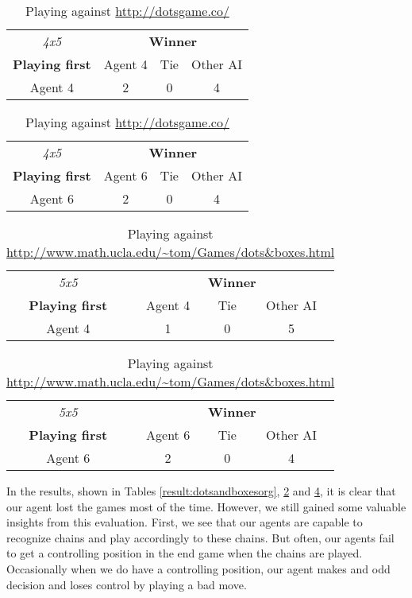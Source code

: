 \begin{table}[!h]
	\centering
	\begin{tabular}{c | c | c | c}
		\textit{4x5} & \multicolumn{3}{c}{\textbf{Winner}}        \\
		\textbf{Playing first} & Agent 4 & Tie & Other AI \\ \hline
		Agent 4 & 2 & 0 & 4
	\end{tabular}
	\quad
	\begin{tabular}{c | c | c | c}
		\textit{4x5} & \multicolumn{3}{c}{\textbf{Winner}}        \\
		\textbf{Playing first} & Agent 6 & Tie & Other AI \\ \hline
		Agent 6 & 2 & 0 & 4
	\end{tabular}
	\caption{\label{result:dotsgameco}Playing against \url{http://dotsgame.co/}}
\end{table}


\begin{table}[!h]
	\centering
	\begin{tabular}{c | c | c | c}
		\textit{5x5} & \multicolumn{3}{c}{\textbf{Winner}}        \\
		\textbf{Playing first} & Agent 4 & Tie & Other AI \\ \hline
		Agent 4 & 1 & 0 & 5
	\end{tabular}
	\quad
	\begin{tabular}{c | c | c | c}
		\textit{5x5} & \multicolumn{3}{c}{\textbf{Winner}}        \\
		\textbf{Playing first} & Agent 6 & Tie & Other AI \\ \hline
		Agent 6 & 2 & 0 & 4
	\end{tabular}
	\caption{\label{result:uclaTom}Playing against \url{http://www.math.ucla.edu/~tom/Games/dots&boxes.html}}
\end{table}

In the results, shown in Tables \ref{result:dotsandboxesorg}, \ref{result:dotsgameco} and \ref{result:uclaTom}, it is clear that our agent lost the games most of the time. However, we still gained some valuable insights from this evaluation. First, we see that our agents are capable to recognize chains and play accordingly to these chains. But often, our agents fail to get a controlling position in the end game when the chains are played. Occasionally when we do have a controlling position, our agent makes and odd decision and loses control by playing a bad move.